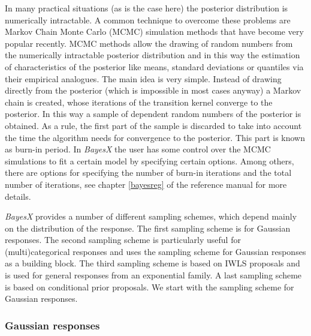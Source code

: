 \documentclass[11pt,a4paper,twoside]{bayesxarticle}
\begin{document}
In many practical situations (as is the case here) the posterior
distribution is numerically intractable. A common technique to
overcome  these problems are Markov Chain Monte Carlo (MCMC)
simulation methods that have become very popular recently. MCMC
methods allow the drawing of random numbers from the numerically
intractable posterior distribution and in this way the estimation of
characteristics of the posterior like means, standard deviations or
quantiles via their empirical analogues. The main idea is very
simple. Instead of drawing directly from the posterior (which is
impossible in most cases anyway) a Markov chain is created, whose
iterations of the transition kernel converge to the posterior. In
this way a sample of dependent random numbers of the posterior is
obtained. As a rule, the first part of the sample is discarded to
take into account the time the algorithm needs for convergence to
the posterior. This part is known as burn-in period. In {\em BayesX}
the user has some control over the MCMC simulations to fit a certain
model by specifying certain options. Among others, there are options
for specifying the number of burn-in iterations and the total number
of iterations, see chapter \ref*{bayesreg} of the reference manual
for more details.

{\em BayesX} provides a number of different sampling schemes,
which depend mainly on the distribution of the response. The first
sampling scheme is for Gaussian responses. The second sampling
scheme is particularly useful for (multi)categorical responses
and uses the sampling scheme for Gaussian responses as a building
block. The third sampling scheme is based on IWLS proposals and is
used for general responses from an exponential family. A last
sampling scheme is based on conditional prior proposals. We start
with the sampling scheme for Gaussian responses.

\subsubsection{Gaussian responses}
\end{document}
